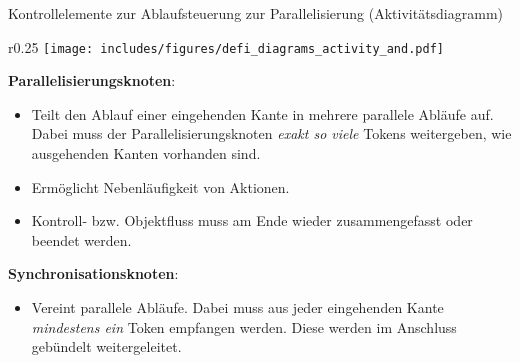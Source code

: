 \begin{diag}{Kontrollelemente zur Ablaufsteuerung zur Parallelisierung (Aktivitätsdiagramm)}
    \begin{wrapfigure}{r}{0.25\textwidth}
        \centering
        \texttt{[image: includes/figures/defi\_diagrams\_activity\_and.pdf]}
    \end{wrapfigure}
    \textbf{Parallelisierungsknoten}:
    \begin{itemize}
        \item Teilt den Ablauf einer eingehenden Kante in mehrere parallele Abläufe auf.
              Dabei muss der Parallelisierungsknoten \emph{exakt so viele} Tokens weitergeben, wie ausgehenden Kanten vorhanden sind.
        \item Ermöglicht Nebenläufigkeit von Aktionen.
        \item Kontroll- bzw. Objektfluss muss am Ende wieder zusammengefasst oder beendet werden.
    \end{itemize}

    \textbf{Synchronisationsknoten}:
    \begin{itemize}
        \item Vereint parallele Abläufe.
              Dabei muss aus jeder eingehenden Kante \emph{mindestens ein} Token empfangen werden.
              Diese werden im Anschluss gebündelt weitergeleitet.
    \end{itemize}
\end{diag}

